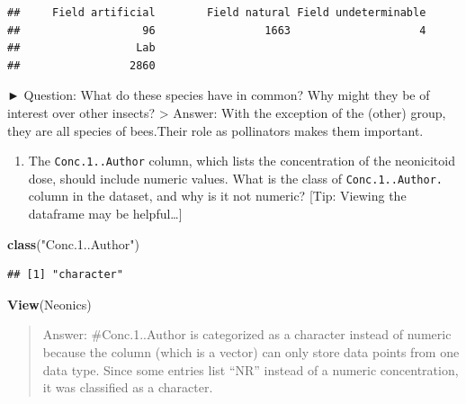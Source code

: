 \documentclass[
]{article}
\newenvironment{Shaded}{\begin{snugshade}}{\end{snugshade}}
\newcommand{\AttributeTok}[1]{\textcolor[rgb]{0.13,0.29,0.53}{#1}}
\newcommand{\DecValTok}[1]{\textcolor[rgb]{0.00,0.00,0.81}{#1}}
\newcommand{\FunctionTok}[1]{\textcolor[rgb]{0.13,0.29,0.53}{\textbf{#1}}}
\newcommand{\NormalTok}[1]{#1}
\newcommand{\SpecialCharTok}[1]{\textcolor[rgb]{0.81,0.36,0.00}{\textbf{#1}}}
\newcommand{\StringTok}[1]{\textcolor[rgb]{0.31,0.60,0.02}{#1}}
\providecommand{\tightlist}{%
  \setlength{\itemsep}{0pt}\setlength{\parskip}{0pt}}
\begin{document}
\begin{Shaded}
\end{Shaded}

\begin{verbatim}
##     Field artificial        Field natural Field undeterminable 
##                   96                 1663                    4 
##                  Lab 
##                 2860
\end{verbatim}

► Question: What do these species have in common? Why might they be of
interest over other insects? \textgreater{} Answer: With the exception
of the (other) group, they are all species of bees.Their role as
pollinators makes them important.

\begin{enumerate}
\def\labelenumi{\arabic{enumi}.}
\setcounter{enumi}{7}
\tightlist
\item
  The \texttt{Conc.1..Author} column, which lists the concentration of
  the neonicitoid dose, should include numeric values. What is the class
  of \texttt{Conc.1..Author.} column in the dataset, and why is it not
  numeric? {[}Tip: Viewing the dataframe may be helpful\ldots{]}
\end{enumerate}

\begin{Shaded}
\begin{Highlighting}[]
\FunctionTok{class}\NormalTok{(}\StringTok{"Conc.1..Author"}\NormalTok{)}
\end{Highlighting}
\end{Shaded}

\begin{verbatim}
## [1] "character"
\end{verbatim}

\begin{Shaded}
\begin{Highlighting}[]
\FunctionTok{View}\NormalTok{(Neonics)}
\end{Highlighting}
\end{Shaded}

\begin{quote}
Answer: \#Conc.1..Author is categorized as a character instead of
numeric because the column (which is a vector) can only store data
points from one data type. Since some entries list ``NR'' instead of a
numeric concentration, it was classified as a character.
\end{quote}
\end{document}
